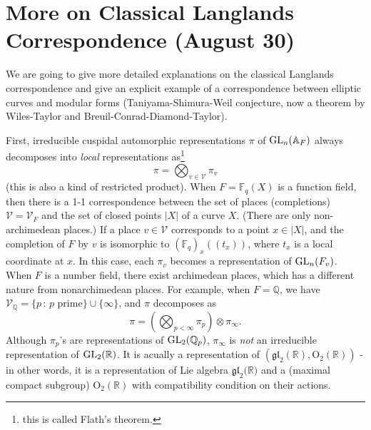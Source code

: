 \newpage
\section{More on Classical Langlands Correspondence (August 30)}

We are going to give more detailed explanations on the classical Langlands correspondence
and give an explicit example of a correspondence between elliptic curves and modular forms
(Taniyama-Shimura-Weil conjecture, now a theorem by Wiles-Taylor and Breuil-Conrad-Diamond-Taylor).

First, irreducible cuspidal automorphic representations $\pi$ of $\operatorname{\mathrm{GL}}_{n}(\mathbb{A}_{F})$
always decomposes into \emph{local} representations as\footnote{this is called Flath's theorem.}
$$
\pi = \bigotimes_{v \in \mathscr{V}}\pi_{v}
$$
(this is also a kind of restricted product).
When $F = \mathbb{F}_{q}(X)$ is a function field, then there is a 1-1 correspondence between
the set of places (completions) $\mathscr{V} = \mathscr{V}_{F}$ and the set of closed points $|X|$ of a curve $X$.
(There are only non-archimedean places.)
If a place $v \in \mathscr{V}$ corresponds to a point $x\in |X|$, and the completion of $F$
by $v$ is isomorphic to $(\mathbb{F}_{q})_{x}((t_{x}))$, where $t_{x}$ is a local coordinate at $x$.
In this case, each $\pi_{v}$ becomes a representation of $\operatorname{\mathrm{GL}}_{n}(F_{v})$.
When $F$ is a number field, there exist archimedean places, which has a different nature from nonarchimedean places.
For example, when $F = \mathbb{Q}$, we have $\mathscr{V}_{\mathbb{Q}} = \{p\,:\,p\text{ prime}\} \cup \{\infty\}$, and
$\pi$ decomposes as
$$
\pi = \left(\bigotimes_{p < \infty} \pi_{p}\right) \otimes \pi_{\infty}.
$$
Although $\pi_{p}$'s are representations of $\operatorname{\mathrm{GL}}_{2}(\mathbb{Q}_{p})$, $\pi_{\infty}$ is \emph{not} an
irreducible representation of $\operatorname{\mathrm{GL}}_{2}(\mathbb{R})$.
It is acually a representation of $(\mathfrak{gl}_{2}(\mathbb{R}), \mathrm{O}_{2}(\mathbb{R}))$ - in other words,
it is a representation of Lie algebra $\mathfrak{gl}_{2}(\mathbb{R)}$ and a (maximal compact subgroup) $\mathrm{O}_{2}(\mathbb{R})$
with compatibility condition on their actions.

